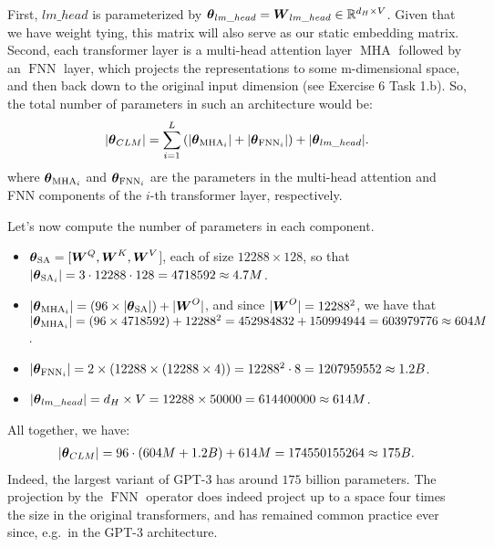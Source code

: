 \documentclass[11pt,a4paper]{article}
\newcommand\op[1]{\operatorname{#1}}
\begin{document}
\begin{enumerate}[label=(\alph*)]
          First, $lm\_head$ is parameterized by
          ${\boldsymbol{\theta}}_{lm\_head} = {\boldsymbol{W}}_{lm\_head}\in\mathbb{R}^{d_H\times V}$.
          Given that we have weight tying, this matrix will also serve as our
          static embedding matrix.
          Second, each transformer layer is a multi-head attention layer
          $\op{MHA}$ followed by an $\op{FNN}$ layer, which projects the
          representations to some m-dimensional space, and then back down to the
          original input dimension (see Exercise 6 Task 1.b).
          So, the total number of parameters in such an architecture would be:
          \begin{align}
              |\vtheta_{CLM}| = \sum_{i=1}^{L} \left(|\vtheta_{\op{MHA}_i}| + |\vtheta_{\op{FNN}_i}|\right) + |\vtheta_{lm\_head}|.
          \end{align}
          where $\vtheta_{\op{MHA}_i}$ and $\vtheta_{\op{FNN}_i}$ are the
          parameters in the multi-head attention and FNN components of the
          $i$-th transformer layer, respectively.

          Let's now compute the number of parameters in each component.
          \begin{itemize}
              \item $\vtheta_{\op{SA}} = [\mW^Q,\mW^K,\mW^V$], each of size
                    $12288\times 128$, so that
                    $|\vtheta_{\op{SA}_i}| = 3\cdot 12288\cdot 128 = 4718592 \approx 4.7M$.
              \item $|\vtheta_{\op{MHA}_i}| = (96\times |\vtheta_{\op{SA}}|) + |\mW^O|$,
                    and since $|{\boldsymbol{W}}^O| = 12288^2$, we have that
                    $|\vtheta_{\op{MHA}_i}| = (96\times 4718592) + 12288^2 = 452984832 + 150994944 = 603979776 \approx 604M$.
              \item $|\vtheta_{\op{FNN}_i}| = 2\times \left(12288\times (12288\times 4)\right) = 12288^2\cdot 8 = 1207959552 \approx 1.2B$.
              \item $|{\boldsymbol{\theta}}_{lm\_head}| = d_H \times V = 12288 \times 50000 = 614400000 \approx 614M$.
          \end{itemize}
          All together, we have:
          \begin{align}
              |{\boldsymbol{\theta}}_{CLM}| = 96\cdot (604M + 1.2B) + 614M = 174550155264 \approx 175B.
          \end{align}
          Indeed, the largest variant of GPT-3 has around $175$ billion
          parameters.
          The projection by the $\op{FNN}$ operator does indeed project up to
          a space four times the size in the original transformers, and has
          remained common practice ever since, e.g.\ in the GPT-3 architecture.


\end{enumerate}
\end{document}
